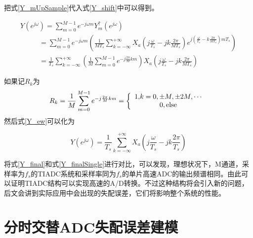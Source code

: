 \begin{enumerate}
			把式\ref{Y_mUpSample}代入式\ref{Y_shift}中可以得到。
				
				\begin{equation}
					\begin{array}{l}
Y({e^{j\omega }}) = \sum\limits_{m = 0}^{M - 1} {{e^{ - j\omega m}}} Y_m^ \uparrow \left( {{e^{j\omega }}} \right)\\
\quad \quad \;\;\, = \sum\limits_{m = 0}^{M - 1} {{e^{ - j\omega m}}\left( {\frac{1}{{M{T_s}}}\sum\limits_{k =  - \infty }^{ + \infty } {{X_a}\left( {j\frac{\omega }{{{T_s}}} - jk\frac{{2\pi }}{{M{T_s}}}} \right)} {e^{j\left( {\frac{\omega }{{{T_s}}} - k\frac{{2\pi }}{{M{T_s}}}} \right)m{T_s}}}} \right)} \\
\quad \quad \;\;\, = \frac{1}{{{T_s}}}\sum\limits_{k =  - \infty }^{ + \infty } {\left( {\frac{1}{M}\sum\limits_{m = 0}^{M - 1} {{e^{ - j\frac{{2\pi }}{M}km}}} } \right)} {X_a}\left( {j\frac{\omega }{{{T_s}}} - jk\frac{{2\pi }}{{M{T_s}}}} \right)
\end{array} \label{Y_ew}
				\end{equation}
			
			如果记$R_k$为
			\begin{equation}
				{R_k} = \frac{1}{M}\sum\limits_{m = 0}^{M - 1} {{e^{ - j\frac{{2\pi }}{M}km}}}  = \left\{ {\begin{array}{*{20}{c}}
{1{\rm{   ,}}k = 0, \pm M, \pm 2M, \cdots }\\
{0{\rm{  ,else                   }}}
\end{array}} \right.{\rm{   }}
			\end{equation}
		然后式\ref{Y_ew}可以化为
		
			\begin{equation}
				Y({e^{j\omega }}) = \frac{1}{{{T_s}}}\sum\limits_{k =  - \infty }^{ + \infty } {{X_a}\left( {j\frac{\omega }{{{T_s}}} - jk\frac{{2\pi }}{{{T_s}}}} \right)}  \label{Y_final}
			\end{equation}
		
		将式\ref{Y_final}和式\ref{Y_finalSingle}进行对比，可以发现，理想状况下，M通道，采样率为$f_s$的TIADC系统和采样率同为$f_s$的单片高速ADC的输出频谱相同。由此可以证明TIADC结构可以实现高速的A/D转换。不过这种结构将会引入新的问题，后文会讲到实际应用中会出现的失配误差，它们将影响整个系统的性能。	
		\end{enumerate}
\section{分时交替ADC失配误差建模}
		
